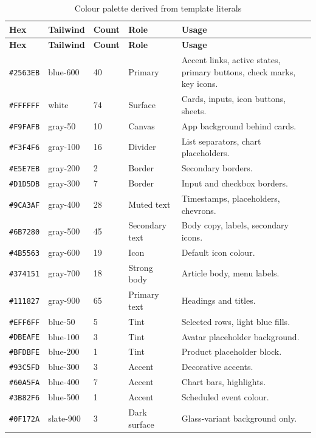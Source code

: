 \begin{longtable}{@{}L{2.3cm}L{2.2cm}L{1.7cm}L{1.2cm}L{5.8cm}@{}}
\caption{Colour palette derived from template literals}\\
\toprule
\textbf{Hex} & \textbf{Tailwind} & \textbf{Count} & \textbf{Role} & \textbf{Usage} \\
\midrule
\endfirsthead
\toprule
\textbf{Hex} & \textbf{Tailwind} & \textbf{Count} & \textbf{Role} & \textbf{Usage} \\
\midrule
\endhead
\texttt{\#2563EB} & blue-600 & 40 & Primary & Accent links, active states, primary
buttons, check marks, key icons. \\
\texttt{\#FFFFFF} & white & 74 & Surface & Cards, inputs, icon buttons, sheets. \\
\texttt{\#F9FAFB} & gray-50 & 10 & Canvas & App background behind cards. \\
\texttt{\#F3F4F6} & gray-100 & 16 & Divider & List separators, chart placeholders. \\
\texttt{\#E5E7EB} & gray-200 & 2 & Border & Secondary borders. \\
\texttt{\#D1D5DB} & gray-300 & 7 & Border & Input and checkbox borders. \\
\texttt{\#9CA3AF} & gray-400 & 28 & Muted text & Timestamps, placeholders, chevrons. \\
\texttt{\#6B7280} & gray-500 & 45 & Secondary text & Body copy, labels, secondary icons. \\
\texttt{\#4B5563} & gray-600 & 19 & Icon & Default icon colour. \\
\texttt{\#374151} & gray-700 & 18 & Strong body & Article body, menu labels. \\
\texttt{\#111827} & gray-900 & 65 & Primary text & Headings and titles. \\
\texttt{\#EFF6FF} & blue-50 & 5 & Tint & Selected rows, light blue fills. \\
\texttt{\#DBEAFE} & blue-100 & 3 & Tint & Avatar placeholder background. \\
\texttt{\#BFDBFE} & blue-200 & 1 & Tint & Product placeholder block. \\
\texttt{\#93C5FD} & blue-300 & 3 & Accent & Decorative accents. \\
\texttt{\#60A5FA} & blue-400 & 7 & Accent & Chart bars, highlights. \\
\texttt{\#3B82F6} & blue-500 & 1 & Accent & Scheduled event colour. \\
\texttt{\#0F172A} & slate-900 & 3 & Dark surface & Glass-variant background only. \\

\end{longtable}
